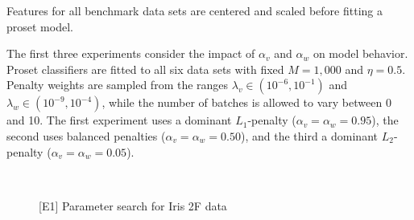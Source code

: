 %
Features for all benchmark data sets are centered and scaled before fitting a proset model.\par
%
The first three experiments consider the impact of $\alpha_v$ and $\alpha_w$ on model behavior.
Proset classifiers are fitted to all six data sets with fixed $M=1,000$ and $\eta=0.5$.
Penalty weights are sampled from the ranges $\lambda_v\in(10^{-6},10^{-1})$ and $\lambda_w\in(10^{-9},10^{-4})$, while the number of batches is allowed to vary between 0 and 10.
The first experiment uses a dominant $L_1$-penalty ($\alpha_v=\alpha_w=0.95$), the second uses balanced penalties ($\alpha_v=\alpha_w=0.50$), and the third a dominant $L_2$-penalty ($\alpha_v=\alpha_w=0.05$).\par
%
\begin{figure}
\caption{[E1] Parameter search for Iris 2F data}
\label{fig_parameter_search}
%
\begin{center}
\\
\end{center}
\end{figure}
